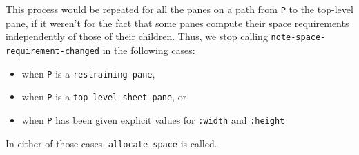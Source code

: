 This process would be repeated for all the panes on a path from \texttt{P}
to the top-level pane, if it weren't for the fact that some panes
compute their space requirements independently of those of their
children.  Thus, we stop calling \texttt{note-space-requirement-changed}
in the following cases:

\begin{itemize}
\item
 when \texttt{P} is a \texttt{restraining-pane},
\item
 when \texttt{P} is a \texttt{top-level-sheet-pane}, or
\item
 when \texttt{P} has been given explicit values for \texttt{:width} and
  \texttt{:height}
\end{itemize}

In either of those cases, \texttt{allocate-space} is called.
